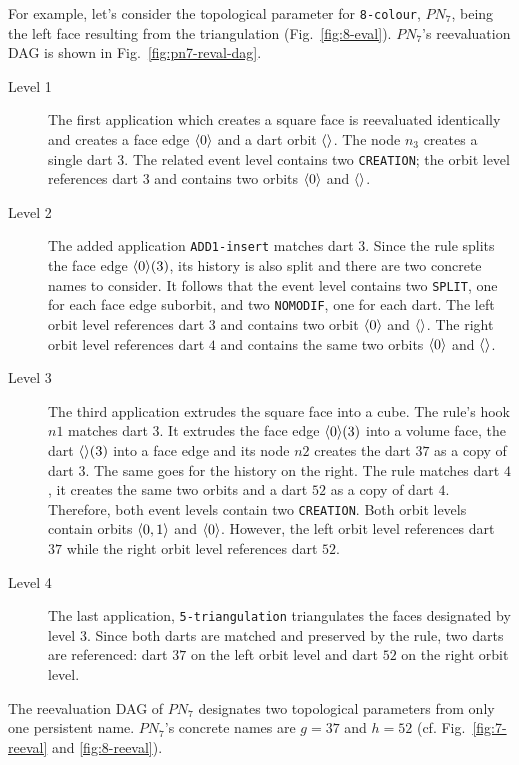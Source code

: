 For example, let's consider the topological parameter for \texttt{8-colour}, $PN_7$, being the left face resulting from the triangulation (Fig.~\ref{fig:8-eval}). %
$PN_7$'s reevaluation DAG is shown in Fig.~\ref{fig:pn7-reval-dag}.%
\begin{description}
  \item[Level 1] The first application which creates a square face is reevaluated identically and creates a face edge $\langle0\rangle$ and a dart orbit $\langle\rangle$. %
  The node $n_3$ creates a single dart $3$. The related event level contains two \texttt{CREATION}; the orbit level references dart $3$ and contains two orbits $\langle0\rangle$ and $\langle\rangle$.
  \item[Level 2] The added application \texttt{ADD1-insert} matches dart $3$. Since the rule splits the face edge $\langle0\rangle(3)$, its history is also split and there are two concrete names to consider. It follows that the event level contains two \texttt{SPLIT}, one for each face edge suborbit, and two \texttt{NOMODIF}, one for each dart.
  The left orbit level references dart $3$ and contains two orbit $\langle0\rangle$ and $\langle\rangle$. The right orbit level references dart $4$ and contains the same two orbits $\langle0\rangle$ and $\langle\rangle$.
  \item[Level 3] The third application extrudes the square face into a cube. The rule's hook $n1$ matches dart $3$. It extrudes the face edge $\langle0\rangle(3)$ into a volume face, the dart $\langle\rangle(3)$ into a face edge and its node $n2$ creates the dart $37$ as a copy of dart $3$. The same goes for the history on the right. The rule matches dart $4$, it creates the same two orbits and a dart $52$ as a copy of dart $4$. %
  Therefore, both event levels contain two \texttt{CREATION}. Both orbit levels contain orbits $\langle0,1\rangle$ and $\langle0\rangle$. However, the left orbit level references dart $37$ while the right orbit level references dart $52$. %
  \item[Level 4] The last application, \texttt{5-triangulation} triangulates the faces designated by level 3. Since both darts are matched and preserved by the rule, two darts are referenced: dart $37$ on the left orbit level and dart $52$ on the right orbit level. %
\end{description}

The reevaluation DAG of $PN_7$ designates two topological parameters from only one persistent name.  $PN_7$'s concrete names are $g=37$ and $h=52$ (cf. Fig.~\ref{fig:7-reeval} and \ref{fig:8-reeval}).

